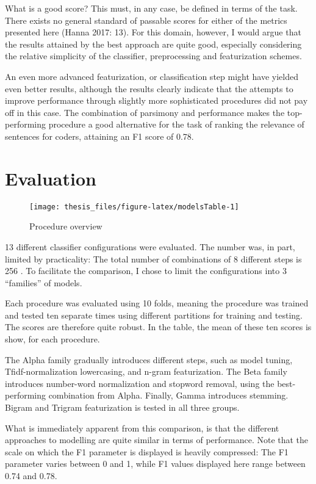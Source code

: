\documentclass[12pt,twoside]{reedthesis}
\begin{document}
What is a good score? This must, in any case, be defined in terms of the
task. There exists no general standard of passable scores for either of
the metrics presented here (Hanna 2017: 13). For this domain, however, I
would argue that the results attained by the best approach are quite
good, especially considering the relative simplicity of the classifier,
preprocessing and featurization schemes.

An even more advanced featurization, or classification step might have
yielded even better results, although the results clearly indicate that
the attempts to improve performance through slightly more sophisticated
procedures did not pay off in this case. The combination of parsimony
and performance makes the top-performing procedure a good alternative
for the task of ranking the relevance of sentences for coders, attaining
an F1 score of 0.78.

\section{Evaluation}\label{evaluation}
\begin{figure}

\texttt{[image: thesis\_files/figure-latex/modelsTable-1]} \hfill{}

\caption{Procedure overview}\label{fig:modelsTable}
\end{figure}
13 different classifier configurations were evaluated. The number was,
in part, limited by practicality: The total number of combinations of 8
different steps is 256 . To facilitate the comparison, I chose to limit
the configurations into 3 ``families'' of models.

Each procedure was evaluated using 10 folds, meaning the procedure was
trained and tested ten separate times using different partitions for
training and testing. The scores are therefore quite robust. In the
table, the mean of these ten scores is show, for each procedure.

The Alpha family gradually introduces different steps, such as model
tuning, Tfidf-normalization lowercasing, and n-gram featurization. The
Beta family introduces number-word normalization and stopword removal,
using the best-performing combination from Alpha. Finally, Gamma
introduces stemming. Bigram and Trigram featurization is tested in all
three groups.

What is immediately apparent from this comparison, is that the different
approaches to modelling are quite similar in terms of performance. Note
that the scale on which the F1 parameter is displayed is heavily
compressed: The F1 parameter varies between 0 and 1, while F1 values
displayed here range between 0.74 and 0.78.
\end{document}
